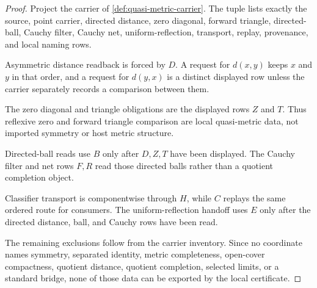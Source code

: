 \begin{proof}
Project the carrier of \autoref{def:quasi-metric-carrier}. The tuple lists exactly the source, point carrier, directed distance, zero diagonal, forward triangle, directed-ball, Cauchy filter, Cauchy net, uniform-reflection, transport, replay, provenance, and local naming rows.

Asymmetric distance readback is forced by $D$. A request for $d(x,y)$ keeps $x$ and $y$ in that order, and a request for $d(y,x)$ is a distinct displayed row unless the carrier separately records a comparison between them.

The zero diagonal and triangle obligations are the displayed rows $Z$ and $T$. Thus reflexive zero and forward triangle comparison are local quasi-metric data, not imported symmetry or host metric structure.

Directed-ball reads use $B$ only after $D,Z,T$ have been displayed. The Cauchy filter and net rows $F,R$ read those directed balls rather than a quotient completion object.

Classifier transport is componentwise through $H$, while $C$ replays the same ordered route for consumers. The uniform-reflection handoff uses $E$ only after the directed distance, ball, and Cauchy rows have been read.

The remaining exclusions follow from the carrier inventory. Since no coordinate names symmetry, separated identity, metric completeness, open-cover compactness, quotient distance, quotient completion, selected limits, or a standard bridge, none of those data can be exported by the local certificate.
\end{proof}

